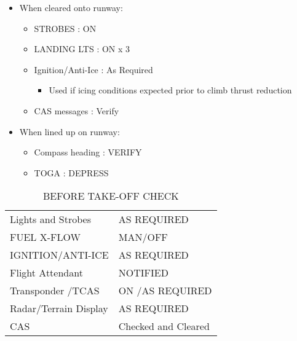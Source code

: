 \begin{itemize}
\item When cleared onto runway:

\begin{itemize}
\item STROBES : ON

\item LANDING LTS : ON x 3

\item Ignition\slash Anti-Ice : As Required

\begin{itemize}
\item Used if icing conditions expected prior to climb thrust reduction

\end{itemize}

\item CAS messages : Verify

\end{itemize}

\item When lined up on runway:

\begin{itemize}
\item Compass heading : VERIFY

\item TOGA : DEPRESS

\end{itemize}

\end{itemize}

\begin{table}[htbp]
\begin{minipage}{\linewidth}
\setlength{\tymax}{0.5\linewidth}
\centering
\small
\caption{BEFORE TAKE-OFF CHECK}
\label{beforetake-offcheck}
\begin{tabulary}{\textwidth}{@{}ll@{}} \toprule
\midrule

 Lights and Strobes & AS REQUIRED   \\
 FUEL X-FLOW   & MAN\slash OFF    \\
 IGNITION\slash ANTI-ICE  & AS REQUIRED   \\
 Flight Attendant  & NOTIFIED   \\
 Transponder \slash  TCAS & ON \slash  AS REQUIRED \\
 Radar\slash Terrain Display & AS REQUIRED   \\
 CAS     & Checked and Cleared \\
\bottomrule

\end{tabulary}
\end{minipage}
\end{table}

